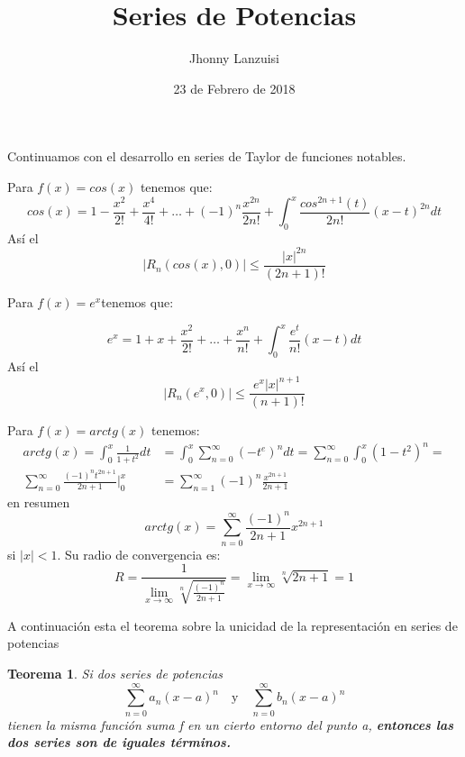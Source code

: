 \documentclass[12pt,a4paper]{article}
\title{Series de Potencias}
\author{Jhonny Lanzuisi}
\date{23 de Febrero de 2018}
\newtheorem{teo}{Teorema}
\begin{document}
\maketitle
	
Continuamos con el desarrollo en series de Taylor de funciones notables.

Para \underline{\(f(x) = cos(x)\)} tenemos que:
\begin{equation}
cos (x) = 1 - \frac{x^2}{2!} + \frac{x^4}{4!} + \dots + (-1)^n \frac{x^{2n}}{2n!} + \int_{0}^{x} \frac{cos^{2n+1}(t)}{2n!} (x-t)^{2n} dt
\end{equation} 	
Así el 
\begin{equation*}
|R_n(cos(x),0)| \leq \frac{|x|^{2n}}{(2n+1)!}
\end{equation*}

Para \underline{\(f(x) = e^x\)}tenemos que:

\begin{equation}
e^x = 1+x+\frac{x^2}{2!} + \dots + \frac{x^n}{n!} + \int_{0}^{x} \frac{e^t}{n!} (x-t) dt
\end{equation}
Así el 
\begin{equation*}
|R_n(e^x,0)| \leq \frac{e^x|x|^{n+1}}{(n+1)!}
\end{equation*}

Para \underline{\(f(x) = arctg(x)\)} tenemos:
\begin{align*}
arctg(x) = \int_{0}^{x} \frac{1}{1+t^2} dt &= \int_{0}^{x} \sum_{n=0}^{\infty} (-t^e)^n dt =\sum_{n=0}^{\infty} \int_{0}^{x} (1-t^2)^n =\\
\sum_{n=0}^{\infty} \frac{(-1)^n t^{2n+1}}{2n+1} \Big|_0^x &= \sum_{n=1}^{\infty} (-1)^n \frac{x^{2n+1}}{2n+1}
\end{align*}
en resumen 
\begin{equation}
arctg(x) = \sum_{n=0}^{\infty} \frac{(-1)^n}{2n+1} x^{2n+1}
\end{equation}
si \( |x| < 1 \). Su radio de convergencia es:
\begin{equation*}
R = \frac{1}{\lim\limits_{x \rightarrow \infty} \sqrt[n]{\frac{(-1)^n}{2n+1}}} = \lim\limits_{x \rightarrow \infty} \sqrt[n]{2n+1} = 1
\end{equation*}

A continuación esta el teorema sobre la unicidad de la representación en series de potencias
\begin{teo}
	Si dos series de potencias 
	\begin{equation*}
	\sum_{n=0}^{\infty} a_n (x-a)^n \quad \text{y} \quad \sum_{n=0}^{\infty} b_n (x-a)^n
	\end{equation*}
	tienen la misma función suma f en un cierto entorno del punto a, \textbf{entonces las dos series son de iguales términos.}
\end{teo}
\end{document}
